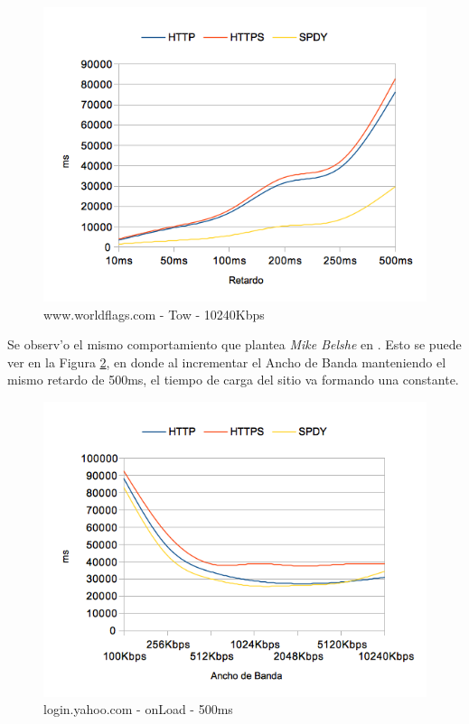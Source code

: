 \documentclass[a4paper,11pt,twocolumn]{article}
\begin{document}
\begin{figure}[h!]
  	\centering
	\includegraphics[scale=0.65]{exp1_4}
	\caption{\small www.worldflags.com - Tow - 10240Kbps}
	\label{graf4}
\end{figure}

Se observ'o el mismo comportamiento que plantea \emph{Mike Belshe} en \cite{moreBand}. Esto se puede ver en la Figura \ref{graf5}, en donde al incrementar el Ancho de Banda manteniendo el mismo retardo de 500ms, el tiempo de carga del sitio va formando una constante.

\begin{figure}[h!]
  	\centering
	\includegraphics[scale=0.65]{exp1_5}
	\caption{\small login.yahoo.com - onLoad - 500ms}
	\label{graf5}
\end{figure}
\end{document}
